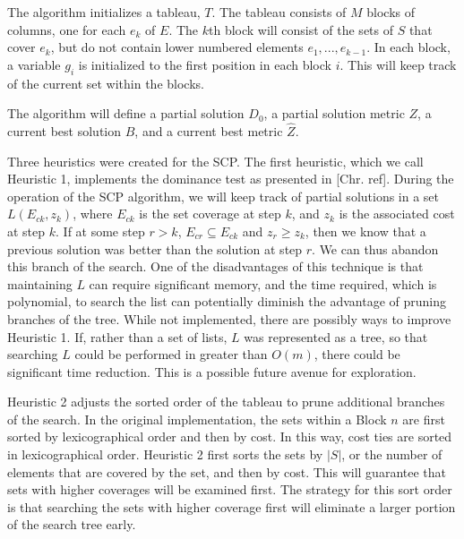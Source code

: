 \documentclass[12pt]{article}
\begin{document}
The algorithm initializes a tableau, $T$. The tableau consists of $M$ blocks of columns, one for each $e_k$ of $E$. The $k$th block will consist of the sets of $S$ that cover $e_k$, but do not contain lower numbered elements $e_1,...,e_{k-1}$. In each block, a variable $g_i$ is initialized to the first position in each block $i$. This will keep track of the current set within the blocks.

The algorithm will define a partial solution $D_0$, a partial solution metric $Z$, a current best solution $\hat{B}$, and a current best metric $\hat{Z}$.


Three heuristics were created for the SCP. The first heuristic, which we call Heuristic 1, implements the dominance test as presented in [Chr. ref]. During the operation of the SCP algorithm, we will keep track of partial solutions in a set $L(E_{ck}, z_k)$, where $E_{ck}$ is the set coverage at step $k$, and $z_k$ is the associated cost at step $k$. If at some step $r > k$, $E_{cr} \subseteq E_{ck}$ and $z_r \geq z_k$, then we know that a previous solution was better than the solution at step $r$. We can thus abandon this branch of the search. One of the disadvantages of this technique is that maintaining $L$ can require significant memory, and the time required, which is polynomial, to search the list can potentially diminish the advantage of pruning branches of the tree. While not implemented, there are possibly ways to improve Heuristic 1. If, rather than a set of lists, $L$ was represented as a tree, so that searching $L$ could be performed in greater than $O(m)$, there could be significant time reduction. This is a possible future avenue for exploration.

Heuristic 2 adjusts the sorted order of the tableau to prune additional branches of the search. In the original implementation, the sets within a Block $n$ are first sorted by lexicographical order and then by cost. In this way, cost ties are sorted in lexicographical order. Heuristic 2 first sorts the sets by $|S|$, or the number of elements that are covered by the set, and then by cost. This will guarantee that sets with higher coverages will be examined first. The strategy for this sort order is that searching the sets with higher coverage first will eliminate a larger portion of the search tree early.
\end{document}
